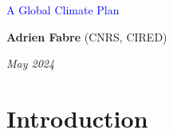 \documentclass[aspectratio=169,xcolor=dvipsnames, 11pt,mathserif]{beamer}
\begin{document}
\begin{frame}
\thispagestyle{empty}
\begin{center}
\begin{LARGE}
\textcolor{blue}{A Global Climate Plan}
\end{LARGE}

\vspace{1cm}
\textbf{Adrien Fabre} (CNRS, CIRED) %




\medskip
{}
\textit{May 2024} 

\end{center}

\bigskip

\end{frame}

\section{Introduction}
\end{document}
